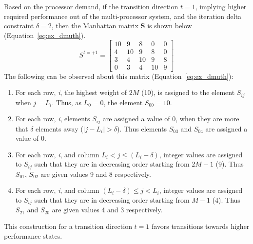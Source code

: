 Based on the processor demand, if the transition direction $t = 1$, implying higher required performance
out of the multi-processor system, and the iteration delta constraint $\delta = 2$, then the Manhattan matrix \textbf{S} 
is shown below (Equation~\eqref{eq:ex_dmuth}).
\begin{equation}
    S^{t = +1} = \left[
     \begin{array}{ccccc}
       10 & 9 & 8 & 0 & 0 \\
       4 & 10 & 9 & 8 & 0 \\
       3 & 4 & 10 & 9 & 8 \\
       0 & 3 & 4 & 10 & 9
     \end{array}
   \right]
\label{eq:ex_dmuth}
\end{equation}
The following can be observed about this matrix (Equation~\eqref{eq:ex_dmuth}):
\begin{enumerate}
\item For each row, \textit{i}, the highest weight of $2M$ (10), is assigned to the element $S_{ij}$ when $j = L_i$. Thus, as $L_0 = 0$, the element $S_{00} = 10$.
\item For each row, \textit{i}, elements $S_{ij}$ are assigned a value of 0, when they are more that $\delta$ elements away ($|j - L_i| > \delta$). Thus elements $S_{03}$ and $S_{04}$
are assigned a value of 0.
\item For each row, \textit{i}, and column $L_i < j \leq (L_i + \delta)$, integer values are assigned to $S_{ij}$ such that they are in decreasing order starting from $2M-1$ (9).
Thus $S_{01}$, $S_{02}$ are given values 9 and 8 respectively. 
\item For each row, \textit{i}, and column $(L_i - \delta) \leq j < L_i$, integer values are assigned to $S_{ij}$ such that they are in decreasing order starting from $M-1$ (4).
Thus $S_{21}$ and $S_{20}$ are given values 4 and 3 respectively.
\end{enumerate}
This construction for a transition direction $t = 1$ favors transitions towards higher performance states. 

